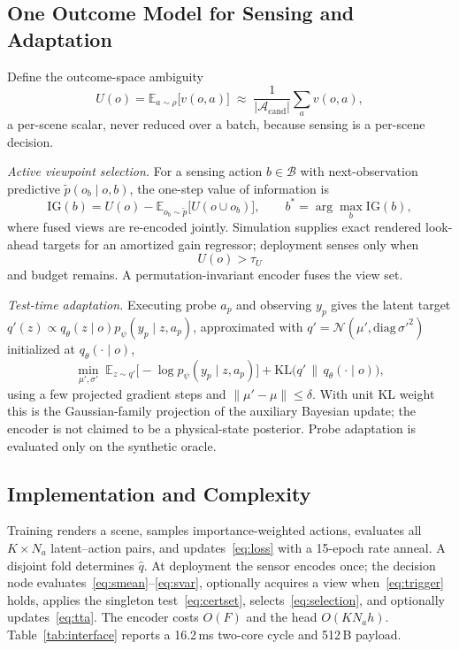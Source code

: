 \documentclass[letterpaper, 10pt, conference]{ieeeconf}
\newcommand{\E}{\mathbb{E}}
\newcommand{\KL}{\mathrm{KL}}
\begin{document}
\subsection{One Outcome Model for Sensing and Adaptation}
\label{sec:active}
Define the outcome-space ambiguity
\begin{equation}
U(o)=\E_{a\sim\rho}\bigl[v(o,a)\bigr]\;\approx\;
\frac{1}{|\mathcal{A}_{\mathrm{cand}}|}\sum_{a}v(o,a),
\label{eq:ambiguity}
\end{equation}
a per-scene scalar, never reduced over a batch, because sensing is a
per-scene decision.

\emph{Active viewpoint selection.}
For a sensing action $b\in\mathcal{B}$ with next-observation predictive
$\tilde p(o_b\mid o,b)$, the one-step value of information is
\begin{equation}
\mathrm{IG}(b)=U(o)-\E_{o_b\sim\tilde p}\bigl[U(o\cup o_b)\bigr],
\qquad b^\ast=\arg\max_b \mathrm{IG}(b),
\label{eq:ig}
\end{equation}
where fused views are re-encoded jointly. Simulation supplies exact rendered
look-ahead targets for an amortized gain regressor; deployment senses only when
\begin{equation}
U(o)>\tau_U
\label{eq:trigger}
\end{equation}
and budget remains. A permutation-invariant encoder fuses the view set.

\emph{Test-time adaptation.}
Executing probe $a_p$ and observing $y_p$ gives the latent target
$q'(z)\propto q_\theta(z\mid o)p_\psi(y_p\mid z,a_p)$, approximated with
$q'=\mathcal{N}(\mu',\mathrm{diag}\,\sigma'^2)$ initialized at
$q_\theta(\cdot\mid o)$,
\begin{equation}
\min_{\mu',\sigma'}\;\E_{z\sim q'}\bigl[-\log p_\psi(y_p\mid z,a_p)\bigr]
+\KL\bigl(q'\,\|\,q_\theta(\cdot\mid o)\bigr),
\label{eq:tta}
\end{equation}
using a few projected gradient steps and $\|\mu'-\mu\|\le\delta$. With unit
KL weight this is the Gaussian-family projection of the auxiliary Bayesian
update; the encoder is not claimed to be a physical-state posterior. Probe
adaptation is evaluated only on the synthetic oracle.

\subsection{Implementation and Complexity}
\label{sec:algorithms}
Training renders a scene, samples importance-weighted actions, evaluates all
$K\times N_a$ latent--action pairs, and updates~\eqref{eq:loss} with a
15-epoch rate anneal. A disjoint fold determines $\hat q$. At deployment the
sensor encodes once; the decision node evaluates~\eqref{eq:smean}--\eqref{eq:svar},
optionally acquires a view when~\eqref{eq:trigger} holds, applies the singleton
test~\eqref{eq:certset}, selects~\eqref{eq:selection}, and optionally
updates~\eqref{eq:tta}. The encoder costs $O(F)$ and the head $O(KN_a h)$.
Table~\ref{tab:interface} reports a 16.2\,ms two-core cycle and 512\,B payload.
\end{document}
